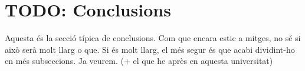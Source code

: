 
\chapter{TODO: Conclusions}

Aquesta és la secció típica de conclusions. Com que encara estic a mitges, no
sé si això serà molt llarg o que. Si és molt llarg, el més segur és que acabi
dividint-ho en més subseccions. Ja veurem. (+ el que he après en aquesta
universitat)
